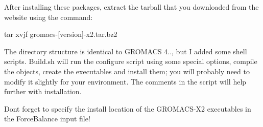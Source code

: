 After installing these packages, extract the tarball that you downloaded from the website using the command\+:

\begin{DoxyVerb}tar xvjf gromacs-[version]-x2.tar.bz2 \end{DoxyVerb}


The directory structure is identical to G\+R\+O\+M\+A\+CS 4.., but I added some shell scripts. {\ttfamily Build.\+sh} will run the configure script using some special options, compile the objects, create the executables and install them; you will probably need to modify it slightly for your environment. The comments in the script will help further with installation.

Don\textquotesingle{}t forget to specify the install location of the G\+R\+O\+M\+A\+C\+S-\/\+X2 executables in the Force\+Balance input file! 
